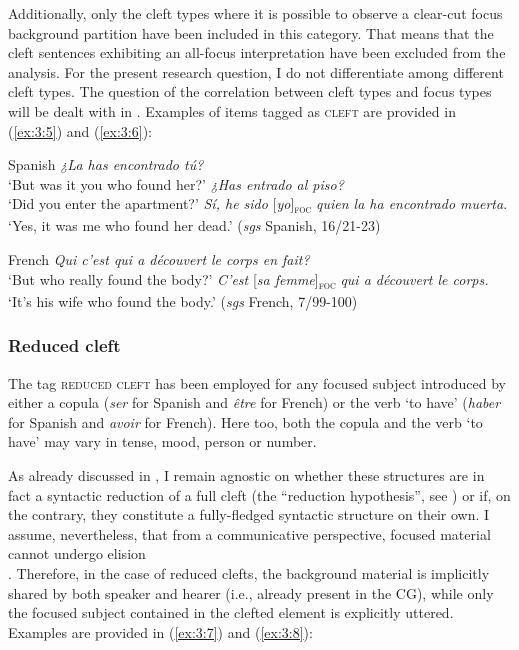 Additionally, only the cleft types where it is possible to observe a clear-cut focus background partition have been included in this category. That means that the cleft sentences exhibiting an all-focus interpretation have been excluded from the analysis. For the present research question, I do not differentiate among different cleft types. The question of the correlation between cleft types and focus types will be dealt with in . Examples of items tagged as \textsc{cleft} are provided in (\ref{ex:3:5}) and (\ref{ex:3:6}):

\ea  \label{ex:3:5} Spanish
\ea \textit{¿La has encontrado tú?} \\
 ‘But was it you who found her?'
 \textit{¿Has entrado al piso?}\\
`Did you enter the apartment?'
\ex \textit{Sí, he sido} [\textit{yo}]\textsubscript{\textsc{foc}} \normalsize \textit{quien la ha encontrado muerta}. \\
‘Yes, it was me who found her dead.' \hfill (\textit{sgs} Spanish, 16/21-23)   
\z
\z
  
\ea \label{ex:3:6}  French
\ea  \textit{Qui c'est qui a découvert le corps en fait?}\\
 ‘But who really found the body?'
\ex \textit{C'est} [\textit{sa femme}]\textsubscript{\textsc{foc}} \normalsize \textit{qui a découvert le corps.} \\
‘It's his wife who found the body.' \hfill (\textit{sgs} French, 7/99-100)    
\z \z 

\subsubsection{Reduced cleft}
The tag \textsc{reduced cleft} has been employed for any focused subject introduced by either a copula (\textit{ser} for Spanish and \textit{être} for French) or the verb `to have' (\textit{haber} for Spanish and \textit{avoir} for French). Here too, both the copula and the verb `to have' may vary in tense, mood, person or number.

As already discussed in , I remain agnostic on whether these structures are in fact a syntactic reduction of a full cleft (the ``reduction hypothesis”, see \cite{jenkins2017cleft}) or if, on the contrary, they constitute a fully-fledged syntactic structure on their own. I assume, nevertheless, that from a communicative perspective, focused material cannot undergo elision \\
\noindent
\parencite{yoshida2013predictive}. Therefore, in the case of reduced clefts, the background material is implicitly shared by both speaker and hearer (i.e., already present in the CG), while only the focused subject contained in the clefted element is explicitly uttered. Examples are provided in (\ref{ex:3:7}) and (\ref{ex:3:8}):


